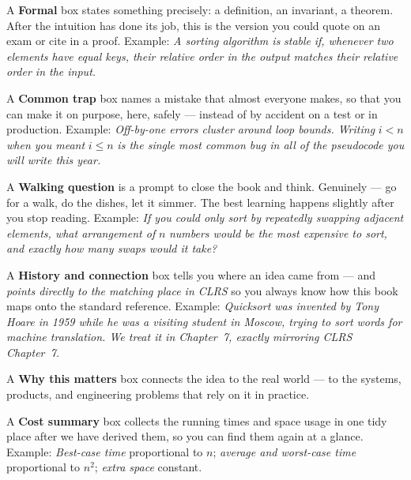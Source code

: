 \begin{formalbox}
A \textbf{Formal} box states something precisely: a definition, an invariant, a
theorem. After the intuition has done its job, this is the version you could quote
on an exam or cite in a proof. Example: \emph{A sorting algorithm is}
\emph{stable} \emph{if, whenever two elements have equal keys, their relative
order in the output matches their relative order in the input.}
\end{formalbox}

\begin{trapbox}
A \textbf{Common trap} box names a mistake that almost everyone makes, so that you
can make it on purpose, here, safely --- instead of by accident on a test or in
production. Example: \emph{Off-by-one errors cluster around loop bounds. Writing} $i < n$
\emph{when you meant} $i \le n$ \emph{is the single most common bug in all of the
pseudocode you will write this year.}
\end{trapbox}

\begin{walkbox}
A \textbf{Walking question} is a prompt to close the book and think. Genuinely ---
go for a walk, do the dishes, let it simmer. The best learning happens slightly
after you stop reading. Example: \emph{If you could only sort by repeatedly
swapping adjacent elements, what arrangement of} $n$ \emph{numbers would be the
most expensive to sort, and exactly how many swaps would it take?}
\end{walkbox}

\begin{historybox}
A \textbf{History and connection} box tells you where an idea came from --- and
\emph{points directly to the matching place in CLRS} so you always know how this
book maps onto the standard reference. Example: \emph{Quicksort was invented by
Tony Hoare in 1959 while he was a visiting student in Moscow, trying to sort
words for machine translation. We treat it in Chapter~7, exactly mirroring CLRS
Chapter~7.}
\end{historybox}

\begin{aestheticbox}
A \textbf{Why this matters} box connects the idea to the real world --- to the
systems, products, and engineering problems that rely on it in practice.
\end{aestheticbox}

\begin{complexitybox}
A \textbf{Cost summary} box collects the running times and space usage in one tidy
place after we have derived them, so you can find them again at a glance. Example:
\emph{Best-case time} proportional to $n$; \emph{average and worst-case time} proportional to $n^2$;
\emph{extra space} constant.
\end{complexitybox}

